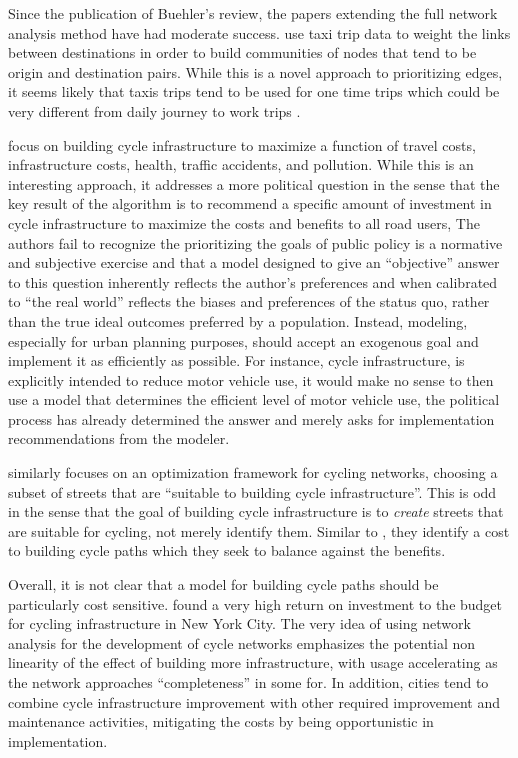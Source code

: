 Since the publication of Buehler's review, the papers extending the full network analysis method have had moderate success. \textcite{akbarzadeh2018designing} use taxi trip data to weight the links between destinations in order to build communities of nodes that tend to be origin and destination pairs. While this is a novel approach to prioritizing edges, it seems likely that taxis trips tend to be used for one time trips which could be very different from daily journey to work trips \parencite{jtw}.

\textcite{doorley2019designing} focus on building cycle infrastructure to maximize a function of travel costs, infrastructure costs, health, traffic accidents, and pollution. While this is an interesting approach, it addresses a more political question in the sense that the key result of the algorithm is to recommend a specific amount of investment in cycle infrastructure to maximize the costs and benefits to all road users, The authors fail to recognize the prioritizing the goals of public policy is a normative and subjective exercise and that a model designed to give an ``objective'' answer to this question inherently reflects the author's preferences and when calibrated to ``the real world'' reflects the biases and preferences of the status quo, rather than the true ideal outcomes preferred by a population. Instead, modeling, especially for urban planning purposes, should accept an exogenous goal and implement it as efficiently as possible. For instance, cycle infrastructure, is explicitly intended to reduce motor vehicle use, it would make no sense to then use a model that determines the efficient level of motor vehicle use, the political process has already determined the answer and merely asks for implementation recommendations from the modeler. 

\textcite{mauttone2017bicycle} similarly focuses on an optimization framework for cycling networks, choosing a subset of streets that are ``suitable to building cycle infrastructure''. This is odd in the sense that the goal of building cycle infrastructure is to \textit{create} streets that are suitable for cycling, not merely identify them. Similar to \textcite{doorley2019designing}, they identify a cost to building cycle paths which they seek to balance against the benefits. 

Overall, it is not clear that a model for building cycle paths should be particularly cost sensitive. \textcite{gu2017cost} found a very high return on investment to the budget for cycling infrastructure in New York City. The very idea of using network analysis for the development of cycle networks emphasizes the potential non linearity of the effect of building more infrastructure, with usage accelerating as the network approaches ``completeness'' in some for. In addition, cities tend to combine cycle infrastructure improvement with other required improvement and maintenance activities, mitigating the costs by being opportunistic in implementation. 

